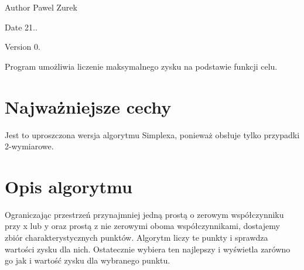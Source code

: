 \begin{DoxyAuthor}{Author}
Pawel Zurek 
\end{DoxyAuthor}
\begin{DoxyDate}{Date}
21.. 
\end{DoxyDate}
\begin{DoxyVersion}{Version}
0.
\end{DoxyVersion}
Program umożliwia liczenie maksymalnego zysku na podstawie funkcji celu.\hypertarget{index_etykieta-wazne-cechy}{}\section{Najważniejsze cechy}\label{index_etykieta-wazne-cechy}
Jest to uproszczona wersja algorytmu Simplexa, ponieważ obsłuje tylko przypadki 2-\/wymiarowe.\hypertarget{index_etykieta-op-algorytm}{}\section{Opis algorytmu}\label{index_etykieta-op-algorytm}
Ograniczając przestrzeń przynajmniej jedną prostą o zerowym współczynniku przy x lub y oraz prostą z nie zerowymi oboma współczynnikami, dostajemy zbiór charakterystycznych punktów. Algorytm liczy te punkty i sprawdza wartości zysku dla nich. Ostatecznie wybiera ten najlepszy i wyświetla zarówno go jak i wartość zysku dla wybranego punktu. 